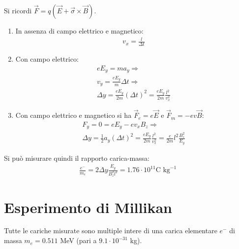 \documentclass[a4paper,11pt,twoside,openany]{book}
\theoremstyle{definition}
\theoremstyle{plain}
\theoremstyle{plain}
\theoremstyle{definition}
\begin{document}
Si ricordi $\vec F=q\left(\vec E+\vec \sigma \times \vec B \right)$.
\begin{enumerate}
\item In assenza di campo elettrico e magnetico:
\begin{equation}\begin{split}
v_x=\frac{l}{\Delta t}
\end{split}\end{equation}
\item Con campo elettrico:
\begin{equation}\begin{split}
eE_y=ma_y \Longrightarrow \\
v_y=\frac{eE_y}{m}\Delta t \Longrightarrow \\
\Delta y=\frac{eE_y}{2m}\left(\Delta t\right)^2=\frac{eE_y}{2m}\frac{l^2}{v^2_x}
\end{split}\end{equation}
\item Con campo elettrico e magnetico si ha $\vec F_e=e\vec E$ e $\vec F_m=-ev\vec B$:
\begin{equation}\begin{split}
F_y=0=eE_y-ev_xB_z \Longrightarrow \\
\Delta y=\frac{1}{2}a_y\left(\Delta t\right)^2=\frac{eE_y}{2m}\frac{l^2}{v^2_x}=\frac{e}{2m}l^2\frac{B^2_z}{E_y}
\end{split}\end{equation}
\end{enumerate}

Si può misurare quindi il rapporto carica-massa:
\begin{equation}\begin{split}
\frac{e^-}{m_e}=2\Delta y \frac{E_y}{B^2_zl^2}=1.76\cdot 10^{11} \textrm{C kg}^{-1}
\end{split}\end{equation}

\section{Esperimento di Millikan} %
Tutte le cariche misurate sono multiple intere di una carica elementare $e^-$ di massa $m_e=0.511$ MeV (pari a $9.1 \cdot 10^{-31}$ kg).
\end{document}
